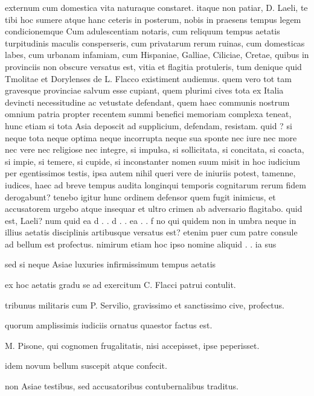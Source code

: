  externum cum domestica vita naturaque constaret. itaque non patiar, D. Laeli, te tibi hoc sumere atque hanc ceteris in posterum, nobis in praesens tempus legem condicionemque Cum adulescentiam notaris, cum reliquum tempus aetatis turpitudinis maculis consperseris, cum privatarum rerum ruinas, cum domesticas labes, cum urbanam infamiam, cum Hispaniae, Galliae, Ciliciae, Cretae, quibus in provinciis non obscure versatus est, vitia et flagitia protuleris, tum denique quid Tmolitae et Dorylenses de L. Flacco existiment audiemus. quem vero tot tam gravesque provinciae salvum esse cupiant, quem plurimi cives tota ex Italia devincti necessitudine ac vetustate defendant, quem haec communis nostrum omnium patria propter recentem summi benefici memoriam complexa teneat, hunc etiam si tota Asia deposcit ad supplicium, defendam, resistam. quid ? si neque tota neque optima neque incorrupta neque sua sponte nec iure nec more nec vere nec religiose nec integre, si impulsa, si sollicitata, si concitata, si coacta, si impie, si temere, si cupide, si inconstanter nomen suum misit in hoc iudicium per egentissimos testis, ipsa autem nihil queri vere de iniuriis potest, tamenne, iudices, haec ad breve tempus audita longinqui temporis cognitarum rerum fidem derogabunt? tenebo igitur hunc ordinem defensor quem fugit inimicus, et accusatorem urgebo atque insequar et ultro crimen ab adversario flagitabo. quid est, Laeli? num quid ea d . . d . . ea . . f no qui quidem non in umbra neque in illius aetatis disciplinis artibusque versatus est? etenim puer cum patre consule ad bellum est profectus. nimirum etiam hoc ipso nomine aliquid . . ia sus

 sed si neque Asiae luxuries infirmissimum tempus aetatis

 ex hoc aetatis gradu se ad exercitum C. Flacci patrui contulit.

 tribunus militaris cum P. Servilio, gravissimo et sanctissimo cive, profectus.

 quorum amplissimis iudiciis ornatus quaestor factus est.

 M. Pisone, qui cognomen frugalitatis, nisi accepisset, ipse peperisset.

 idem novum bellum suscepit atque confecit.

 non Asiae testibus, sed accusatoribus contubernalibus traditus.

